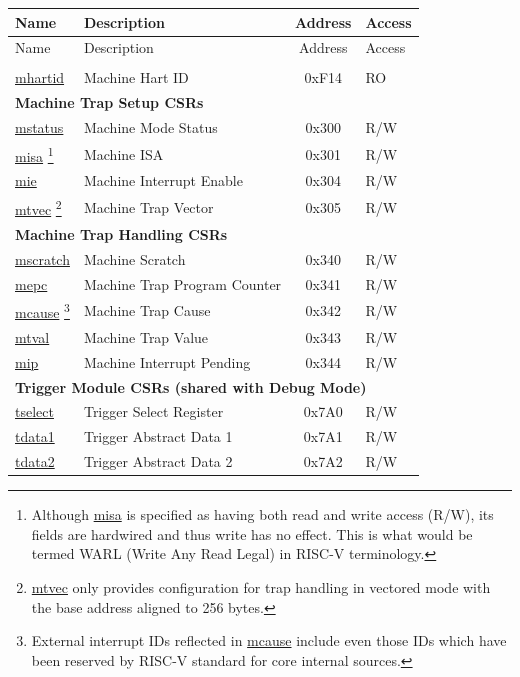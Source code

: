 \begin{longtable}{ | p{4.0cm} | p{8.4cm} | c | l | }
\hline\rowcolor{lightgray}
Name & Description & Address & Access \\ \hline
\endfirsthead
\hline
\rowcolor{lightgray}
Name & Description & Address & Access \\
\hline
\endhead
\endfoot

\multicolumn{4}{|l|}{\textbf{Machine Information CSR}} \\\hline
\hyperref[regdesc:LPMHARTID]{mhartid} & Machine Hart ID & 0xF14 & RO \\\hline

\multicolumn{4}{|l|}{\textbf{Machine Trap Setup CSRs}} \\\hline
\hyperref[regdesc:LPMSTATUS]{mstatus} & Machine Mode Status & 0x300 & R/W \\\hline
\hyperref[regdesc:LPMISA]{misa} \footnote{Although \hyperref[regdesc:LPMISA]{misa} is specified as having both read and write access (R/W), its fields are hardwired and thus write has no effect. This is what would be termed WARL (Write Any Read Legal) in RISC-V terminology.} & Machine ISA & 0x301 & R/W \\\hline
\hyperref[regdesc:LPMIE]{mie} & Machine Interrupt Enable & 0x304 & R/W \\\hline
\hyperref[regdesc:LPMTVEC]{mtvec} \footnote{\hyperref[regdesc:LPMTVEC]{mtvec} only provides configuration for trap handling in vectored mode with the base address aligned to 256 bytes.} & Machine Trap Vector & 0x305 & R/W \\\hline

\multicolumn{4}{|l|}{\textbf{Machine Trap Handling CSRs}} \\\hline
\hyperref[regdesc:LPMSCRATCH]{mscratch} & Machine Scratch & 0x340 & R/W \\\hline
\hyperref[regdesc:LPMEPC]{mepc} & Machine Trap Program Counter & 0x341 & R/W \\\hline
\hyperref[regdesc:LPMCAUSE]{mcause} \footnote{External interrupt IDs reflected in \hyperref[regdesc:LPMCAUSE]{mcause} include even those IDs which have been reserved by RISC-V standard for core internal sources.} & Machine Trap Cause & 0x342 & R/W \\\hline
\hyperref[regdesc:LPMTVAL]{mtval} & Machine Trap Value & 0x343 & R/W \\\hline
\hyperref[regdesc:LPMIP]{mip} & Machine Interrupt Pending & 0x344 & R/W \\\hline
\multicolumn{4}{|l|}{\textbf{Trigger Module CSRs (shared with Debug Mode)}} \\\hline
\hyperref[regdesc:LPTSELECT]{tselect} & Trigger Select Register & 0x7A0 & R/W \\\hline
\hyperref[regdesc:LPTDATA1]{tdata1} & Trigger Abstract Data 1 & 0x7A1 & R/W \\\hline
\hyperref[regdesc:LPTDATA2]{tdata2} & Trigger Abstract Data 2 & 0x7A2 & R/W \\\hline


\end{longtable}
